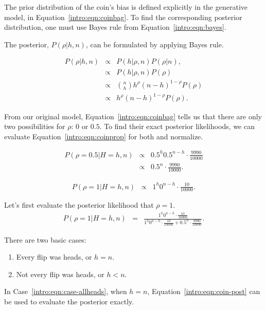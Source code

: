 The prior distribution of the coin's bias is defined explicitly in the generative model, in Equation~\ref{intro:eqn:coinbag}. To find the corresponding posterior distribution, one must use Bayes rule from Equation~\ref{intro:eqn:bayes}.

The posterior, $P(\rho|h,n)$, can be formulated by applying Bayes rule.

\begin{eqnarray}
P(\rho|h,n) & \propto & P(h|\rho,n)P(\rho|n),\\
\label{intro:eqn:coinprop} & \propto & P(h|\rho,n)P(\rho)\\
&\propto& {n \choose h} h^\rho (n-h)^{1-\rho} P(\rho)\\
&\propto& h^\rho (n-h)^{1-\rho} P(\rho).
\end{eqnarray}

From our original model, Equation~\ref{intro:eqn:coinbag} tells us that there are only two possibilities for $\rho$: $0$ or $0.5$. To find their exact posterior likelihoods, we can evaluate Equation~\ref{intro:eqn:coinprop} for both and normalize.

\begin{eqnarray}
P(\rho=0.5|H=h,n) & \propto & {0.5}^h {0.5}^{n-h} \cdot \frac{9990}{10000}\\
& \propto & {0.5}^n \cdot \frac{9990}{10000}.
\end{eqnarray}

\begin{eqnarray}
P(\rho=1|H=h,n) & \propto &  1^h 0^{n-h} \cdot \frac{10}{10000}.
\end{eqnarray}

Let's first evaluate the posterior likelihood that $\rho=1$.
\begin{eqnarray}
\label{intro:eqn:coin-post}P(\rho=1|H=h,n) & = & \frac{1^h 0^{n-h} \cdot \frac{10}{10000}}{1^h 0^{n-h} \cdot \frac{10}{10000}+{0.5}^n \cdot \frac{9990}{10000}}.
\end{eqnarray}

There are two basic cases:
\begin{enumerate}
\item \label{intro:eqn:case-allheads} Every flip was heads, or $h=n$.
\item \label{intro:eqn:case-notallheads} Not every flip was heads, or $h<n$.
\end{enumerate}

In Case~\ref{intro:eqn:case-allheads}, when $h=n$, Equation~\ref{intro:eqn:coin-post} can be used to evaluate the posterior exactly.

